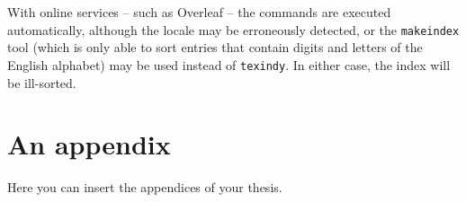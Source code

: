 \documentclass[
  digital, %
  table,   %
  lof,     %
  lot,     %
]{fithesis3}
\begin{document}
With online services -- such as Overleaf -- the commands are
executed automatically, although the locale may be erroneously
detected, or the \texttt{makeindex} tool (which is only able to
sort entries that contain digits and letters of the English
alphabet) may be used instead of \texttt{texindy}. In either case,
the index will be ill-sorted.

  \makeatletter\thesis@blocks@clear\makeatother
  \printindex

\appendix %
\chapter{An appendix}
Here you can insert the appendices of your thesis.
\end{document}

